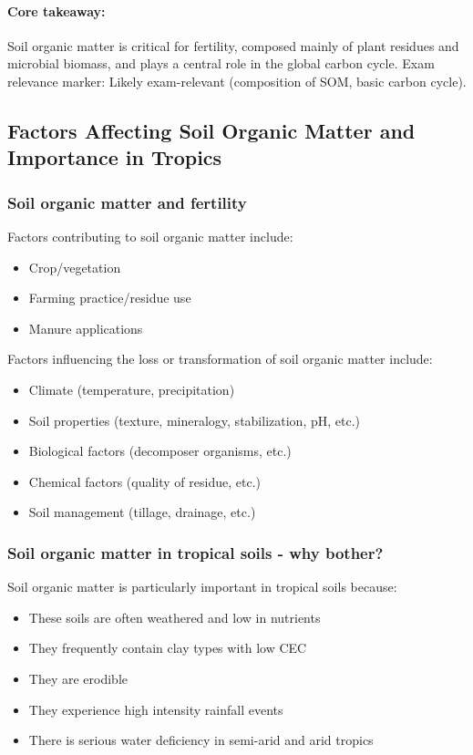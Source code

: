 \paragraph*{Core takeaway:} 
Soil organic matter is critical for fertility, composed mainly of plant residues and microbial biomass, and plays a central role in the global carbon cycle. Exam relevance marker: Likely exam-relevant (composition of SOM, basic carbon cycle).

\subsection{Factors Affecting Soil Organic Matter and Importance in Tropics} 
\subsubsection*{Soil organic matter and fertility}  
Factors contributing to soil organic matter include: 

\begin{itemize} 
    \item Crop/vegetation 
    \item Farming practice/residue use 
    \item Manure applications 
\end{itemize}

Factors influencing the loss or transformation of soil organic matter include: 

\begin{itemize} 
    \item Climate (temperature, precipitation) 
    \item Soil properties (texture, mineralogy, stabilization, pH, etc.) 
    \item Biological factors (decomposer organisms, etc.) 
    \item Chemical factors (quality of residue, etc.) 
    \item Soil management (tillage, drainage, etc.) 
\end{itemize}

\subsubsection*{Soil organic matter in tropical soils - why bother?} Soil organic matter is particularly important in tropical soils because: 

\begin{itemize} 
    \item These soils are often weathered and low in nutrients 
    \item They frequently contain clay types with low CEC \item They are erodible 
    \item They experience high intensity rainfall events 
    \item There is serious water deficiency in semi-arid and arid tropics 
\end{itemize}

